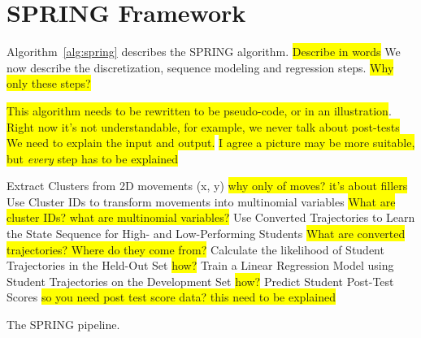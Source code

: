 \documentclass{sigchi}
\newcommand{\hl}[1]{\colorbox{yellow}{#1}}
\def\algname{SPRING\xspace}
\begin{document}
\section{SPRING Framework}
Algorithm~\ref{alg:spring} describes the SPRING algorithm.
\hl{Describe in words}
We now describe  the discretization, sequence modeling and regression steps.  
\hl{Why only these steps?}

\hl{This algorithm needs to be rewritten to be pseudo-code, or in an illustration}.
\hl{ Right now it's not understandable, for example, we never talk about post-tests}
\hl{We need to explain the input and output.}
\hl{I agree a  picture may be more suitable, but \textit{every} step has to be explained}

\begin{algorithm}
\begin{algorithmic}
\State Extract Clusters from 2D movements (x, y) \hl{why only of moves? it's about fillers}
\State Use Cluster IDs to transform movements into multinomial variables  \hl{What are cluster IDs? what are multinomial variables?}
\State Use Converted Trajectories to Learn the State Sequence for High- and Low-Performing Students \hl{What are converted trajectories? Where do they come from?}
\State Calculate the likelihood of Student Trajectories in the Held-Out Set  \hl{how?}
\State Train a Linear Regression Model using Student Trajectories on the Development Set \hl{how?}
\State Predict Student Post-Test Scores \hl{so you need post test score data? this need to be explained}
\end{algorithmic}
\caption{The \algname pipeline. \label{alg:spring}}
\end{algorithm}
\end{document}
